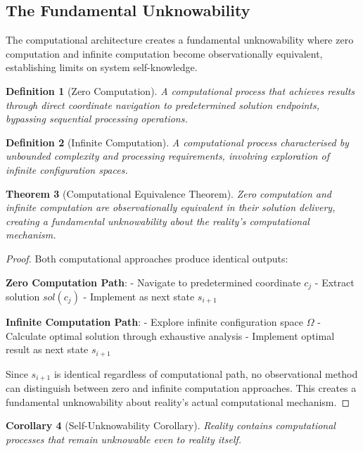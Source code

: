 \documentclass[12pt,a4paper]{article}
\newtheorem{theorem}{Theorem}[section]
\newtheorem{corollary}[theorem]{Corollary}
\newtheorem{definition}[theorem]{Definition}
\begin{document}
\subsection{The Fundamental Unknowability}

The computational architecture creates a fundamental unknowability where zero computation and infinite computation become observationally equivalent, establishing limits on system self-knowledge.

\begin{definition}[Zero Computation]
A computational process that achieves results through direct coordinate navigation to predetermined solution endpoints, bypassing sequential processing operations.
\end{definition}

\begin{definition}[Infinite Computation]
A computational process characterised by unbounded complexity and processing requirements, involving exploration of infinite configuration spaces.
\end{definition}

\begin{theorem}[Computational Equivalence Theorem]
Zero computation and infinite computation are observationally equivalent in their solution delivery, creating a fundamental unknowability about the reality's computational mechanism.
\end{theorem}

\begin{proof}
Both computational approaches produce identical outputs:

\textbf{Zero Computation Path}:
- Navigate to predetermined coordinate $c_j$
- Extract solution $sol(c_j)$
- Implement as next state $s_{i+1}$

\textbf{Infinite Computation Path}:
- Explore infinite configuration space $\Omega$
- Calculate optimal solution through exhaustive analysis
- Implement optimal result as next state $s_{i+1}$

Since $s_{i+1}$ is identical regardless of computational path, no observational method can distinguish between zero and infinite computation approaches. This creates a fundamental unknowability about reality's actual computational mechanism.
\end{proof}

\begin{corollary}[Self-Unknowability Corollary]
Reality contains computational processes that remain unknowable even to reality itself.
\end{corollary}
\end{document}

